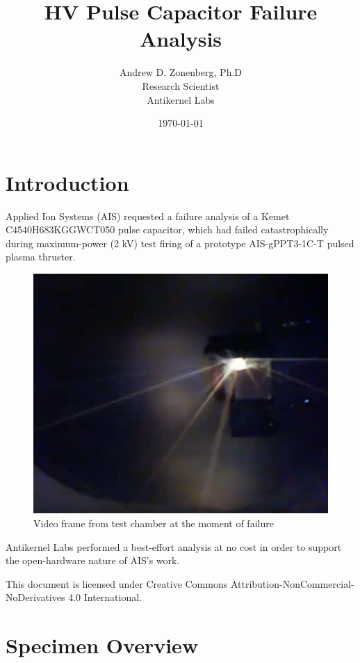 \documentclass{article}
\begin{document}
\title{HV Pulse Capacitor Failure Analysis }
\author {Andrew D. Zonenberg, Ph.D \\ Research Scientist \\ Antikernel Labs}
\date{\today}
\maketitle

\section{Introduction}

Applied Ion Systems (AIS) requested a failure analysis of a Kemet C4540H683KGGWCT050 pulse capacitor, which had failed
catastrophically during maximum-power (2 kV) test firing of a prototype AIS-gPPT3-1C-T pulsed plasma thruster.

\begin{figure}[h]
\includegraphics[scale=0.35]{cap-failure.jpg}
\caption{Video frame from test chamber at the moment of failure}
\label{failure}
\end{figure}

Antikernel Labs performed a best-effort analysis at no cost in order to support the open-hardware nature of AIS's work.

This document is licensed under Creative Commons Attribution-NonCommercial-NoDerivatives 4.0 International.

\pagebreak
\section{Specimen Overview}
\end{document}
